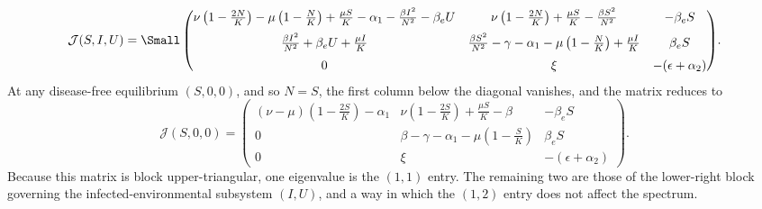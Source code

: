 \documentclass[12pt,a4paper,reqno]{amsart}
\theoremstyle{definition}
\theoremstyle{remark}
\theoremstyle{plain}
\begin{document}
$$
\mathcal{J}(S,I,U)=
{\Small
\begin{pmatrix}
\nu\left(1-\frac{2N}{K}\right)-\mu\left(1-\frac{N}{K}\right)+\frac{\mu S}{K}-\alpha_1-\frac{\beta I^2}{N^2}-\beta_e U
&
\nu\left(1-\frac{2N}{K}\right)+\frac{\mu S}{K}-\frac{\beta S^2}{N^2}
&
-\beta_e S
\\[6pt]
\frac{\beta I^2}{N^2}+\beta_e U+\frac{\mu I}{K}
&
\frac{\beta S^2}{N^2}-\gamma-\alpha_1-\mu\left(1-\frac{N}{K}\right)+\frac{\mu I}{K}
&
\beta_e S
\\[6pt]
0 & \xi & -(\epsilon+\alpha_2)
\end{pmatrix}
}.
$$
At any disease-free equilibrium $(S,0,0)$, and so $N=S$, the first column below the diagonal vanishes, and the matrix reduces to
$$
\mathcal{J}(S,0,0)=
\begin{pmatrix}
(\nu-\mu)\left(1-\frac{2S}{K}\right)-\alpha_1
&
\nu\left(1-\frac{2S}{K}\right)+\frac{\mu S}{K}-\beta
&
-\beta_e S
\\[4pt]
0
&
\beta-\gamma-\alpha_1-\mu\left(1-\frac{S}{K}\right)
&
\beta_e S
\\[4pt]
0 & \xi & -(\epsilon+\alpha_2)
\end{pmatrix}.
$$
Because this matrix is block upper-triangular, one eigenvalue is the $(1,1)$ entry. The remaining two are those of the lower-right block governing the infected-environmental subsystem $(I,U)$, and a way in which the $(1,2)$ entry does not affect the spectrum.
\end{document}
